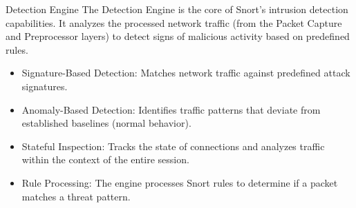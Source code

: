 \begin{frame}[t]{Detection Engine}
  \fontsize{12.5}{15}\selectfont
  \vspace{0.1cm}
  The Detection Engine is the core of Snort's intrusion detection capabilities. It analyzes the processed network traffic (from the Packet Capture and Preprocessor layers) to detect signs of malicious activity based on predefined rules.
  \vspace{0.15cm}
  \begin{itemize}
    \item \textcolor{WarningColor}{Signature-Based Detection:} Matches network traffic against predefined attack signatures.
    \item \textcolor{WarningColor}{Anomaly-Based Detection:} Identifies traffic patterns that deviate from established baselines (normal behavior).
    \item \textcolor{WarningColor}{Stateful Inspection:} Tracks the state of connections and analyzes traffic within the context of the entire session.
    \item \textcolor{WarningColor}{Rule Processing:} The engine processes Snort rules to determine if a packet matches a threat pattern.
  \end{itemize}
\end{frame}
